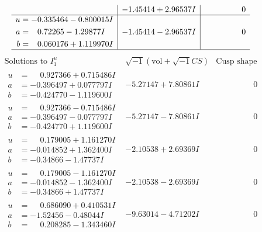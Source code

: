 \documentclass[1p]{elsarticle_modified}
\theoremstyle{definition}
\newcommand{\I}{\sqrt{-1}}
\begin{document}
$$\begin{array}{c|c|c}
 & -1.45414 + 2.96537 I & \phantom{-0.000000 } 0 \\ \hline\begin{aligned}
u &= -0.335464 - 0.800015 I \\
a &= \phantom{-}0.72265 - 1.29877 I \\
b &= \phantom{-}0.060176 + 1.119970 I\end{aligned}
 & -1.45414 - 2.96537 I & \phantom{-0.000000 } 0\\
 \hline 
 \end{array}$$\newpage$$\begin{array}{c|c|c}  
\text{Solutions to }I^u_{1}& \I (\text{vol} + \sqrt{-1}CS) & \text{Cusp shape}\\
 \hline 
\begin{aligned}
u &= \phantom{-}0.927366 + 0.715486 I \\
a &= -0.396497 + 0.077797 I \\
b &= -0.424770 - 1.119600 I\end{aligned}
 & -5.27147 + 7.80861 I & \phantom{-0.000000 } 0 \\ \hline\begin{aligned}
u &= \phantom{-}0.927366 - 0.715486 I \\
a &= -0.396497 - 0.077797 I \\
b &= -0.424770 + 1.119600 I\end{aligned}
 & -5.27147 - 7.80861 I & \phantom{-0.000000 } 0 \\ \hline\begin{aligned}
u &= \phantom{-}0.179005 + 1.161270 I \\
a &= -0.014852 + 1.362400 I \\
b &= -0.34866 - 1.47737 I\end{aligned}
 & -2.10538 + 2.69369 I & \phantom{-0.000000 } 0 \\ \hline\begin{aligned}
u &= \phantom{-}0.179005 - 1.161270 I \\
a &= -0.014852 - 1.362400 I \\
b &= -0.34866 + 1.47737 I\end{aligned}
 & -2.10538 - 2.69369 I & \phantom{-0.000000 } 0 \\ \hline\begin{aligned}
u &= \phantom{-}0.686090 + 0.410531 I \\
a &= -1.52456 - 0.48044 I \\
b &= \phantom{-}0.208285 - 1.343460 I\end{aligned}
 & -9.63014 - 4.71202 I & \phantom{-0.000000 } 0 \\ \hline\begin{aligned}

\end{aligned}
\end{array}$$
\end{document}
